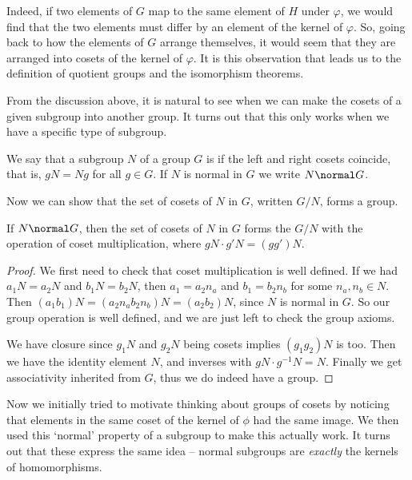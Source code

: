 \documentclass[a4paper]{scrartcl}
\begin{document}
Indeed, if two elements of $G$ map to the same element of $H$ under $\varphi$, we would find that the two elements must differ by an element of the kernel of $\varphi$. So, going back to how the elements of $G$ arrange themselves, it would seem that they are arranged into cosets of the kernel of $\varphi$. It is this observation that leads us to the definition of quotient groups and the isomorphism theorems.


From the discussion above, it is natural to see when we can make the cosets of a given subgroup into another group. It turns out that this only works when we have a specific type of subgroup.

\begin{definition*}
	We say that a subgroup $N$ of a group $G$ is  if the left and right cosets coincide, that is, $gN = Ng$ for all $g \in G$. If $N$ is normal in $G$ we write $N \normal G$.
\end{definition*}

Now we can show that the set of cosets of $N$ in $G$, written $G/N$, forms a group.

\begin{theorem*}
	If $N \normal G$, then the set of cosets of $N$ in $G$ forms the  $G/N$ with the operation of coset multiplication, where $gN \cdot g'N = (g g')N$.
\end{theorem*}
\begin{proof}
	We first need to check that coset multiplication is well defined. If we had $a_1 N = a_2N$ and $b_1 N = b_2 N$, then $a_1 = a_2 n_a$ and $b_1 = b_2 n_b$ for some $n_a, n_b \in N$. Then $(a_1 b_1)N = (a_2 n_a b_2 n_b)N = (a_2 b_2)N$, since $N$ is normal in $G$. So our group operation is well defined, and we are just left to check the group axioms.

	We have closure since $g_1 N$ and $g_2N$ being cosets implies $(g_1 g_2)N$ is too. Then we have the identity element $N$, and inverses with $gN \cdot g^{-1}N = N$. Finally we get associativity inherited from $G$, thus we do indeed have a group.
\end{proof}

Now we initially tried to motivate thinking about groups of cosets by noticing that elements in the same coset of the kernel of $\phi$ had the same image. We then used this `normal' property of a subgroup to make this actually work. It turns out that these express the same idea -- normal subgroups are \emph{exactly} the kernels of homomorphisms.
\end{document}
